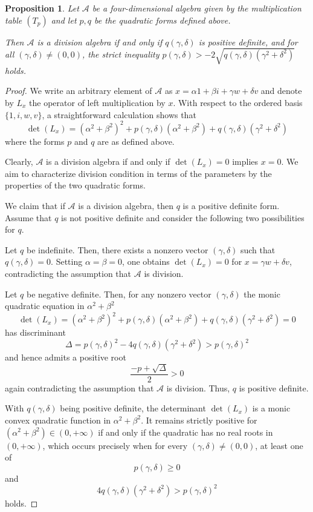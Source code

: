 \documentclass{amsart}
\theoremstyle{definition}
\theoremstyle{plain}
\newtheorem{proposition}{Proposition}
\begin{document}
\begin{proposition}
Let $\mathcal{A}$ be a four-dimensional algebra given by the multiplication table $(T_p)$ and let $p,q$ be the quadratic forms defined above. 

Then $\mathcal{A}$ is a division algebra if and only if $q(\gamma,\delta)$ is positive definite, and for all $(\gamma,\delta)\neq(0,0)$, the strict inequality $p(\gamma,\delta)> -2\sqrt{q(\gamma,\delta)(\gamma^2+\delta^2)}$ holds.
\end{proposition}
\begin{proof}
We write an arbitrary element of $\mathcal{A}$ as $x=\alpha1+\beta i+\gamma w+\delta v$ and denote by $L_x$ the operator of left multiplication by $x$. With respect to the ordered basis $\{1,i,w,v\}$, a straightforward calculation shows that
$$\det(L_x)=(\alpha^2+\beta^2)^2+p(\gamma,\delta)(\alpha^2+\beta^2)+q(\gamma,\delta)(\gamma^2+\delta^2)$$
where the forms $p$ and $q$ are as defined above.

Clearly, $\mathcal{A}$ is a division algebra if and only if $\det(L_x)=0$ implies $x=0$. We aim to characterize division condition in terms of the parameters by the properties of the two quadratic forms.

We claim that if $\mathcal{A}$ is a division algebra, then $q$ is a positive definite form.  Assume that $q$ is not positive definite and consider the following two possibilities for $q$. 


Let $q$ be indefinite. Then, there exists a nonzero vector $(\gamma,\delta)$ such that $q(\gamma,\delta)=0$. Setting $\alpha=\beta=0$, one obtains $\det(L_x)=0$ for $x=\gamma w+\delta v$, contradicting the assumption that $\mathcal{A}$ is division. 

Let $q$ be negative definite. Then, for any nonzero vector $(\gamma,\delta)$ the monic quadratic equation in $\alpha^2+\beta^2$
$$\det(L_x)=(\alpha^2+\beta^2)^2+p(\gamma,\delta)(\alpha^2+\beta^2)+q(\gamma,\delta)(\gamma^2+\delta^2)=0$$
has discriminant
$$\Delta=p(\gamma,\delta)^2-4q(\gamma,\delta)(\gamma^2+\delta^2)>p(\gamma,\delta)^2$$
and hence admits a positive root
$$\dfrac{-p+\sqrt{\Delta}}{2}>0$$
again contradicting the assumption that $\mathcal{A}$ is division. Thus, $q$ is positive definite.

With $q(\gamma,\delta)$ being positive definite, the determinant $\det(L_x)$ is a monic convex quadratic function in $\alpha^2+\beta^2$. It remains strictly positive for $(\alpha^2+\beta^2)\in(0,+\infty)$ if and only if the quadratic has no real roots in $(0,+\infty)$, which occurs precisely when for every $(\gamma,\delta)\neq(0,0)$, at least one of $$p(\gamma,\delta)\geq 0$$ and $$4q(\gamma,\delta)(\gamma^2+\delta^2)> p(\gamma,\delta)^2$$ holds.


\end{proof}
\end{document}
